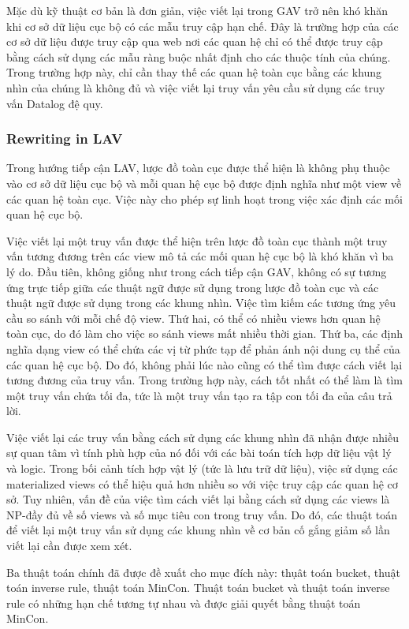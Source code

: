 \documentclass[a4paper]{article}
\begin{document}
Mặc dù kỹ thuật cơ bản là đơn giản, việc viết lại trong GAV trở nên khó khăn khi cơ sở dữ liệu cục bộ có các mẫu truy cập hạn chế. Đây là trường hợp của các cơ sở dữ liệu được truy cập qua web nơi các quan hệ chỉ có thể được truy cập bằng cách sử dụng các mẫu ràng buộc nhất định cho các thuộc tính của chúng. Trong trường hợp này, chỉ cần thay thế các quan hệ toàn cục bằng các khung nhìn của chúng là không đủ và việc viết lại truy vấn yêu cầu sử dụng các truy vấn Datalog đệ quy.
\subsubsection{Rewriting in LAV}
Trong hướng tiếp cận LAV, lược đồ toàn cục được thể hiện là không phụ thuộc vào cơ sở dữ liệu cục bộ và mỗi quan hệ cục bộ được định nghĩa như một view về các quan hệ toàn cục. Việc này cho phép sự linh hoạt trong việc xác định các mối quan hệ cục bộ.


Việc viết lại một truy vấn được thể hiện trên lược đồ toàn cục thành một truy vấn tương đương trên các view mô tả các mối quan hệ cục bộ là khó khăn vì ba lý do. Đầu tiên, không giống như trong cách tiếp cận GAV, không có sự tương ứng trực tiếp giữa các thuật ngữ được sử dụng trong lược đồ toàn cục và các thuật ngữ được sử dụng trong các khung nhìn. Việc tìm kiếm các tương ứng yêu cầu so sánh với mỗi chế độ view.
Thứ hai, có thể có nhiều views hơn quan hệ toàn cục, do đó làm cho việc so sánh views mất nhiều thời gian. Thứ ba, các định nghĩa dạng view có thể chứa các vị từ phức tạp để phản ánh nội dung cụ thể của các quan hệ cục bộ. Do đó, không phải lúc nào cũng có thể tìm được cách viết lại tương đương của truy vấn. Trong trường hợp này, cách tốt nhất có thể làm là tìm một truy vấn chứa tối đa, tức là một truy vấn tạo ra tập con tối đa của câu trả lời.


Việc viết lại các truy vấn bằng cách sử dụng các khung nhìn đã nhận được nhiều sự quan tâm vì tính phù hợp của nó đối với các bài toán tích hợp dữ liệu vật lý và logic. Trong bối cảnh tích hợp vật lý (tức là lưu trữ dữ liệu), việc sử dụng các materialized views có thể hiệu quả hơn nhiều so với việc truy cập các quan hệ cơ sở. Tuy nhiên, vấn đề của việc tìm cách viết lại bằng cách sử dụng các views là NP-đầy đủ về số  views và số mục tiêu con trong truy vấn. Do đó, các thuật toán để viết lại một truy vấn sử dụng các khung nhìn về cơ bản cố gắng giảm số lần viết lại cần được xem xét.


Ba thuật toán chính đã được đề xuất cho mục đích này: thụât toán bucket, thuật toán inverse rule, thuật toán MinCon. Thuật toán bucket và thuật toán inverse rule có những hạn chế tương tự nhau và được giải quyết bằng thuật toán MinCon.
\end{document}
